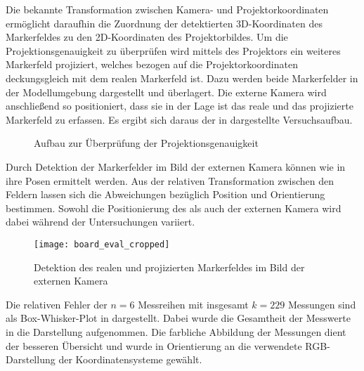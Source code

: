 Die bekannte Transformation zwischen Kamera- und Projektorkoordinaten ermöglicht daraufhin die Zuordnung der detektierten 3D-Koordinaten des Markerfeldes zu den 2D-Koordinaten des Projektorbildes. Um die Projektionsgenauigkeit zu überprüfen wird mittels des Projektors ein weiteres Markerfeld projiziert, welches bezogen auf die Projektorkoordinaten deckungsgleich mit dem realen Markerfeld ist. Dazu werden beide Markerfelder in der Modellumgebung dargestellt und überlagert. Die externe Kamera wird anschließend so positioniert, dass sie in der Lage ist das reale und das projizierte Markerfeld zu erfassen. Es ergibt sich daraus der in  dargestellte Versuchsaufbau.\\

\begin{figure}[ht]
	\begin{center}%
		\caption{Aufbau zur Überprüfung der Projektionsgenauigkeit}
		\label{fig.projsetup}
	\end{center}
\end{figure}

Durch Detektion der Markerfelder im Bild der externen Kamera können wie in  ihre Posen ermittelt werden. Aus der relativen Transformation zwischen den Feldern lassen sich die Abweichungen bezüglich Position und Orientierung bestimmen. Sowohl die Positionierung des  als auch der externen Kamera wird dabei während der Untersuchungen variiert.\\

\begin{figure}[!ht]
	\begin{center}
		\texttt{[image: board\_eval\_cropped]}
		\caption{Detektion des realen und projizierten Markerfeldes im Bild der externen Kamera}
		\label{fig.arprojected}
	\end{center}
\end{figure}

Die relativen Fehler der $n=6$ Messreihen mit insgesamt $k=229$ Messungen sind als Box-Whisker-Plot in  dargestellt. Dabei wurde die Gesamtheit der Messwerte in die Darstellung aufgenommen. Die farbliche Abbildung der Messungen dient der besseren Übersicht und wurde in Orientierung an die verwendete RGB-Darstellung der Koordinatensysteme gewählt.

